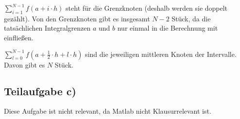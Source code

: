 $\sum_{i=1}^{N-1} f(a + i \cdot h)$ steht für die Grenzknoten
 (deshalb werden sie doppelt gezählt). Von den Grenzknoten gibt es 
insgesamt $N-2$ Stück, da die tatsächlichen Integralgrenzen $a$ und $b$ 
nur einmal in die Berechnung mit einfließen.

$\sum_{l=0}^{N-1} f(a + \frac{1}{2} \cdot h + l \cdot h)$ sind die jeweiligen 
mittleren Knoten der Intervalle. Davon gibt es $N$ Stück.

\subsection*{Teilaufgabe c)}
Diese Aufgabe ist nicht relevant, da Matlab nicht Klausurrelevant ist.
